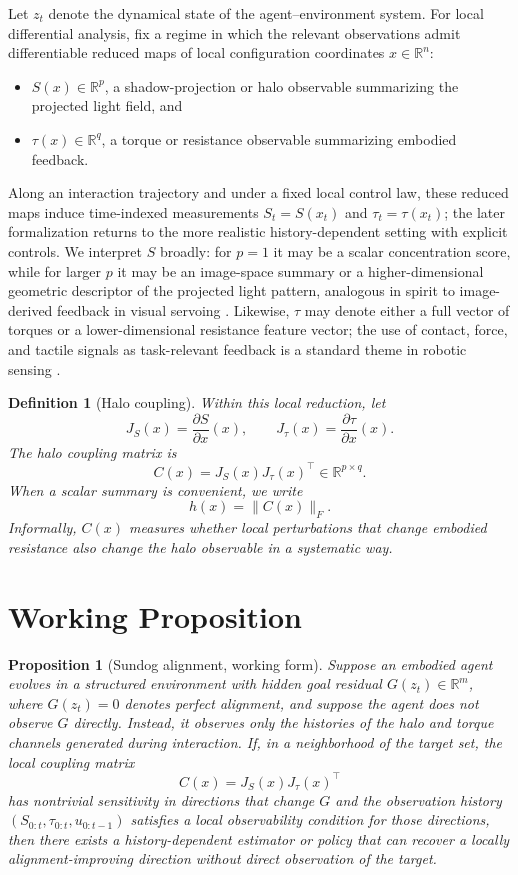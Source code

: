 \documentclass[11pt]{article}
\newtheorem{proposition}{Proposition}
\newtheorem{definition}{Definition}
\begin{document}
Let $z_t$ denote the dynamical state of the agent--environment system. For local differential analysis, fix a regime in which the relevant observations admit differentiable reduced maps of local configuration coordinates $x \in \mathbb{R}^n$:

\begin{itemize}
    \item $S(x) \in \mathbb{R}^p$, a shadow-projection or halo observable summarizing the projected light field, and
    \item $\tau(x) \in \mathbb{R}^q$, a torque or resistance observable summarizing embodied feedback.
\end{itemize}

Along an interaction trajectory and under a fixed local control law, these reduced maps induce time-indexed measurements $S_t=S(x_t)$ and $\tau_t=\tau(x_t)$; the later formalization returns to the more realistic history-dependent setting with explicit controls. We interpret $S$ broadly: for $p=1$ it may be a scalar concentration score, while for larger $p$ it may be an image-space summary or a higher-dimensional geometric descriptor of the projected light pattern, analogous in spirit to image-derived feedback in visual servoing \cite{chaumette2006}. Likewise, $\tau$ may denote either a full vector of torques or a lower-dimensional resistance feature vector; the use of contact, force, and tactile signals as task-relevant feedback is a standard theme in robotic sensing \cite{dahiya2010}.

\begin{definition}[Halo coupling]
Within this local reduction, let
\[
J_S(x) = \frac{\partial S}{\partial x}(x),
\qquad
J_\tau(x) = \frac{\partial \tau}{\partial x}(x).
\]
The halo coupling matrix is
\[
C(x) = J_S(x)J_\tau(x)^\top \in \mathbb{R}^{p \times q}.
\]
When a scalar summary is convenient, we write
\[
h(x) = \lVert C(x) \rVert_F.
\]
Informally, $C(x)$ measures whether local perturbations that change embodied resistance also change the halo observable in a systematic way.
\end{definition}

\section{Working Proposition}

\begin{proposition}[Sundog alignment, working form]
Suppose an embodied agent evolves in a structured environment with hidden goal residual $G(z_t) \in \mathbb{R}^m$, where $G(z_t)=0$ denotes perfect alignment, and suppose the agent does not observe $G$ directly. Instead, it observes only the histories of the halo and torque channels generated during interaction. If, in a neighborhood of the target set, the local coupling matrix
\[
C(x) = J_S(x)J_\tau(x)^\top
\]
has nontrivial sensitivity in directions that change $G$ and the observation history $(S_{0:t},\tau_{0:t},u_{0:t-1})$ satisfies a local observability condition for those directions, then there exists a history-dependent estimator or policy that can recover a locally alignment-improving direction without direct observation of the target.
\end{proposition}
\end{document}
